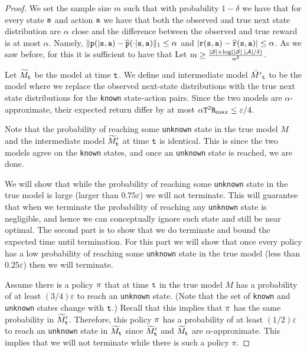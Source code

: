 \begin{proof}
We set the sample size $m$ such that with probability $1-\delta$ we
have that for every state ${\tt s}$ and action ${\tt a}$ we have that
both the observed and true next state distribution are $\alpha$
close and the difference between the observed and true reward is at
most $\alpha$. Namely,
$\|{\tt p}(|{\tt s},{\tt a})-\widehat{{\tt p}}(\cdot|{\tt s},{\tt a})\|_1\leq
\alpha$ and
$|{\tt r}({\tt s},{\tt a})-\widehat{{\tt r}}({\tt s},{\tt a})|\leq
\alpha$.
As we saw before, for this it is sufficient to have that
Let $m\geq
\frac{|\mathcal{S}|+\log(|\mathcal{S}|\;|\mathcal{A}|/\delta)}{\alpha^2}$.

Let $\widetilde{M}_{\tt t}$ be the model at time ${\tt t}$. We define and intermediate model
$\tilde{M'}_{\tt t}$ to be the model where we replace the observed
next-state distributions with the true next state distributions for the \texttt{known} state-action pairs.
Since the two models are $\alpha$-approximate, their expected return
differ by at most $\alpha{\tt T}^2{\tt R}_{\max }\leq \varepsilon/4$.

Note that the probability of reaching some \texttt{unknown} state in the true model $M$ and the intermediate model
$\widetilde{M}'_{\tt t}$ at time ${\tt t}$ is identical. This is since the
two models agree on the \texttt{known} states, and once an \texttt{unknown} state is
reached, we are done.

We will show that while the probability of reaching some \texttt{unknown} state in the true model is large (larger than $0.75\varepsilon$) we will not terminate. This will guarantee that when we terminate the probability of reaching any \texttt{unknown} state is negligible, and hence we can conceptually ignore such state and still be near optimal. The second part is to show that we do terminate and bound the expected time until termination. For this part we will show that once every policy has a low probability of reaching some \texttt{unknown} state in the true model  (less than $0.25\varepsilon$) then we will terminate. 

Assume there is a policy $\pi$ that at time ${\tt t}$ in the true
model $M$ has a probability of at least $(3/4)\varepsilon$ to reach
an \texttt{unknown} state. (Note that the set of \texttt{known} and \texttt{unknown} states
change with ${\tt t}$.) Recall that this implies that $\pi$ has
the same probability in $\widetilde{M}'_{\tt t}$. Therefore, this policy $\pi$
has a probability of at least $(1/2)\varepsilon$ to reach an \texttt{unknown}
state in $\widetilde{M}_{\tt t}$ since $\widetilde{M}'_{\tt t}$ and
$\widetilde{M}_{\tt t}$ are $\alpha$-approximate. This implies that we will not terminate while there is such a policy $\pi$.


\end{proof}
